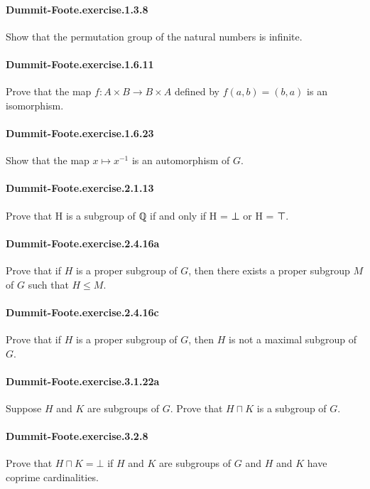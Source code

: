 \documentclass{article}
\begin{document}
\paragraph{Dummit-Foote.exercise.1.3.8} Show that the permutation group of the natural numbers is infinite.

\paragraph{Dummit-Foote.exercise.1.6.11} Prove that the map $f : A × B → B × A$ defined by $f(a, b) = (b, a)$ is an isomorphism.

\paragraph{Dummit-Foote.exercise.1.6.23} Show that the map $x \mapsto x^{-1}$ is an automorphism of $G$.

\paragraph{Dummit-Foote.exercise.2.1.13} Prove that H is a subgroup of ℚ if and only if H = ⊥ or H = ⊤.

\paragraph{Dummit-Foote.exercise.2.4.16a} Prove that if $H$ is a proper subgroup of $G$, then there exists a proper subgroup $M$ of $G$ such that $H ≤ M$.

\paragraph{Dummit-Foote.exercise.2.4.16c} Prove that if $H$ is a proper subgroup of $G$, then $H$ is not a maximal subgroup of $G$.

\paragraph{Dummit-Foote.exercise.3.1.22a} Suppose $H$ and $K$ are subgroups of $G$. Prove that $H ⊓ K$ is a subgroup of $G$.

\paragraph{Dummit-Foote.exercise.3.2.8} Prove that $H ⊓ K = ⊥$ if $H$ and $K$ are subgroups of $G$ and $H$ and $K$ have coprime cardinalities.
\end{document}
